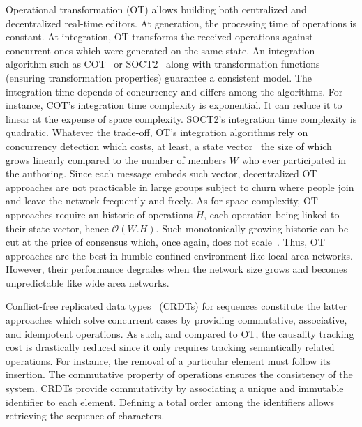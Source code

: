 \begin{asparadesc}
\item [Operational transformation] (OT) allows building both centralized and
  decentralized real-time editors. At generation, the processing time of
  operations is constant. At integration, OT transforms the received operations
  against concurrent ones which were generated on the same state. An integration
  algorithm such as COT~\cite{sun2009contextbased} or
  SOCT2~\cite{vidot2000copies} along with transformation functions (ensuring
  transformation properties) guarantee a consistent model. The integration time
  depends of concurrency and differs among the algorithms.  For instance, COT's
  integration time complexity is exponential. It can reduce it to linear at the
  expense of space complexity. SOCT2's integration time complexity is quadratic.
  Whatever the trade-off, OT's integration algorithms rely on concurrency
  detection which costs, at least, a state
  vector~\cite{charronbost1991concerning} the size of which grows linearly
  compared to the number of members $W$ who ever participated in the
  authoring. Since each message embeds such vector, decentralized OT approaches
  are not practicable in large groups subject to churn where people join and
  leave the network frequently and freely.  As for space complexity, OT
  approaches require an historic of operations $H$, each operation being linked
  to their state vector, hence $\mathcal{O}(W.H)$. Such monotonically growing
  historic can be cut at the price of consensus which, once again, does not
  scale~\cite{mostefaoui2015signature}. Thus, OT approaches are the best in
  humble confined environment like local area networks. However, their
  performance degrades when the network size grows and becomes unpredictable
  like wide area networks.

\item [Conflict-free replicated data types~\cite{shapiro2011comprehensive,
    shapiro2011conflict}] (CRDTs) for sequences constitute the latter approaches
  which solve concurrent cases by providing commutative, associative, and
  idempotent operations. As such, and compared to OT, the causality tracking
  cost is drastically reduced since it only requires tracking semantically
  related operations. For instance, the removal of a particular element must
  follow its insertion. The commutative property of operations ensures the
  consistency of the system. CRDTs provide commutativity by associating a unique
  and immutable identifier to each element. Defining a total order among the
  identifiers allows retrieving the sequence of characters.


\end{asparadesc}
